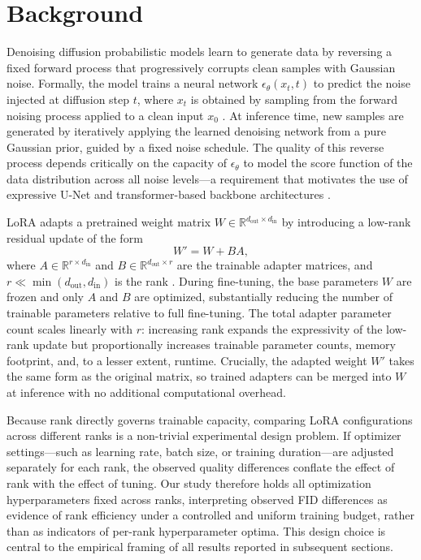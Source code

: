 \section{Background}

Denoising diffusion probabilistic models learn to generate data by reversing a fixed forward
process that progressively corrupts clean samples with Gaussian noise. Formally, the model
trains a neural network $\epsilon_\theta(x_t, t)$ to predict the noise injected at diffusion
step $t$, where $x_t$ is obtained by sampling from the forward noising process applied to a
clean input $x_0$ \cite{ho2020ddpm}. At inference time, new samples are generated by
iteratively applying the learned denoising network from a pure Gaussian prior, guided by a
fixed noise schedule. The quality of this reverse process depends critically on the capacity
of $\epsilon_\theta$ to model the score function of the data distribution across all noise
levels---a requirement that motivates the use of expressive U-Net and transformer-based
backbone architectures \cite{ho2020ddpm, peebles2023dit}.

LoRA adapts a pretrained weight matrix $W \in \mathbb{R}^{d_{\text{out}} \times d_{\text{in}}}$
by introducing a low-rank residual update of the form
\begin{equation}
  W' = W + BA,
  \label{eq:lora}
\end{equation}
where $A \in \mathbb{R}^{r \times d_{\text{in}}}$ and $B \in \mathbb{R}^{d_{\text{out}} \times r}$
are the trainable adapter matrices, and $r \ll \min(d_{\text{out}}, d_{\text{in}})$ is the
rank \cite{hu2022lora}. During fine-tuning, the base parameters $W$ are frozen and only $A$
and $B$ are optimized, substantially reducing the number of trainable parameters relative to
full fine-tuning. The total adapter parameter count scales linearly with $r$: increasing rank
expands the expressivity of the low-rank update but proportionally increases trainable parameter
counts, memory footprint, and, to a lesser extent, runtime. Crucially, the adapted weight
$W'$ takes the same form as the original matrix, so trained adapters can be merged into $W$
at inference with no additional computational overhead.

Because rank directly governs trainable capacity, comparing LoRA configurations across
different ranks is a non-trivial experimental design problem. If optimizer settings---such as
learning rate, batch size, or training duration---are adjusted separately for each rank, the
observed quality differences conflate the effect of rank with the effect of tuning. Our study
therefore holds all optimization hyperparameters fixed across ranks, interpreting observed FID
differences as evidence of rank efficiency under a controlled and uniform training budget,
rather than as indicators of per-rank hyperparameter optima. This design choice is central to
the empirical framing of all results reported in subsequent sections.